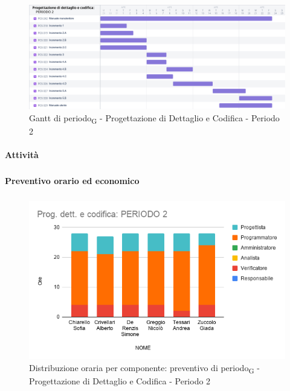\begin{figure}[H]
	\centering
	\includegraphics[scale=0.40]{res/images/gantt_periodo/progdett_2_gantt.png}
	\caption{Gantt di periodo\textsubscript{G} - Progettazione di Dettaglio e Codifica - Periodo 2}
\end{figure}

\paragraph{Attività}
\subparagraph*{}

\planningTable{
	
}



\paragraph{Preventivo orario ed economico}
\subparagraph*{}

\contabilitaTable{
	
}

\begin{figure}[H]
	\centering
	\includegraphics[scale=0.6]{res/images/charts/preventivo/prog_dett_2.png}
	\caption{Distribuzione oraria per componente: preventivo di periodo\textsubscript{G} - Progettazione di Dettaglio e Codifica - Periodo 2}
\end{figure}



